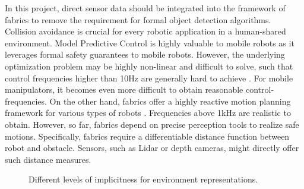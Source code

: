 In this project, direct sensor data should be integrated into
the framework of \ac{fabrics} to remove the requirement for formal
object detection algorithms. Collision avoidance is crucial for every robotic
application in a human-shared environment. Model Predictive Control is highly
valuable to mobile robots as it leverages formal safety guarantees to mobile
robots. However, the underlying optimization problem may be highly non-linear
and difficult to solve, such that control frequencies higher than 10Hz are generally
hard to achieve \cite{hewing2020learning}. For mobile manipulators, it
becomes even more difficult to obtain reasonable control-frequencies. On the
other hand, \ac{fabrics} offer a highly reactive motion planning
framework for various types of robots \cite{Ratliff2021}.
Frequencies above 1kHz are realistic to obtain. However, so far, \ac{fabrics}
depend on precise perception tools to realize safe motions.
Specifically, \ac{fabrics} require a differentiable distance function
between robot and obstacle. Sensors, such as Lidar or depth cameras, might
directly offer such distance measures. 

\begin{figure}
  \centering
  
  \caption{Different levels of implicitness for environment representations.}
  \label{fig:overview}
\end{figure}


